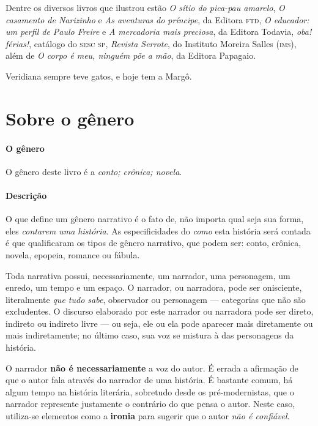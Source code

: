 \documentclass[11pt]{extarticle}
\begin{document}
Dentre os diversos livros que ilustrou estão \textit{O sítio do pica-pau amarelo}, \textit{O casamento de Narizinho} e
\textit{As aventuras do príncipe}, da Editora \textsc{ftd}, \textit{O educador: um perfil de Paulo Freire} e \textit{A mercadoria mais preciosa}, da Editora Todavia, \textit{oba! férias!}, catálogo do \textsc{sesc sp}, \textit{Revista Serrote}, do Instituto Moreira Salles (\textsc{ims}), além de \textit{O corpo é meu, ninguém põe a mão}, 
da Editora Papagaio. 

Veridiana sempre teve gatos, e hoje tem a Margô.


\section{Sobre o gênero}

\paragraph{O gênero} O gênero deste livro é a \textit{conto; crônica; novela}. 

\paragraph{Descrição} O que define um gênero narrativo é o fato de, não importa
qual seja sua forma, eles \textit{contarem uma história}.
As especificidades do \textit{como} esta história será contada é que
qualificaram os tipos de gênero narrativo, que podem ser: conto, crônica, novela,
epopeia, romance ou fábula. 

Toda narrativa possui, necessariamente, um narrador, uma personagem, um enredo,
um tempo e um espaço. O narrador, ou narradora, pode ser onisciente, literalmente
\textit{que tudo sabe}, observador ou personagem --- categorias que não são excludentes.
O discurso elaborado por este narrador ou narradora pode ser direto, indireto ou indireto livre 
--- ou seja, ele ou ela pode aparecer mais diretamente ou mais indiretamente; no último caso,
sua voz se mistura à das personagens da história.

O narrador \textbf{não é necessariamente} a voz do autor. É errada a afirmação
de que o autor fala através do narrador de uma história. É bastante comum,
há algum tempo na história literária, sobretudo desde os pré-modernistas, que 
o narrador represente justamente o contrário do que pensa o autor. Neste caso, 
utiliza-se elementos como a \textbf{ironia} para sugerir que o autor \textit{não é confiável}.
\end{document}
